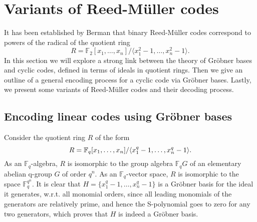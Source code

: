 \documentclass[english,bachelor]{liumaiex}
\begin{document}
\section{Variants of Reed-M{\"u}ller codes}
It has been established by Berman \cite{berman} that binary Reed-M{\"u}ller codes correspond to powers of the radical of the quotient ring
\begin{displaymath}
R=\mathbb{F}_2[x_1,\dots,x_n]/\langle x_1^2-1,\dots,x_n^2-1\rangle.
\end{displaymath}
In this section we will explore a strong link between the theory of Gröbner bases and cyclic codes, defined in terms of ideals in quotient rings. Then we give an outline of a general encoding process for a cyclic code via Gröbner bases. Lastly, we present some variants of Reed-M{\"u}ller codes and their decoding process.

\subsection{Encoding linear codes using Gröbner bases}
Consider the quotient ring $R$ of the form
\begin{displaymath}
R=\mathbb{F}_q[x_1,\dots,x_n]/\langle x_1^q-1,\dots,x_n^q-1\rangle.
\end{displaymath}
As an $\mathbb{F}_q$-algebra, $R$ is isomorphic to the group algebra $\mathbb{F}_qG$ of an elementary abelian q-group $G$ of order $q^n$. As an $\mathbb{F}_q$-vector space, $R$ is isomorphic to the space $\mathbb{F}_q^{q^n}$. It is clear that $H=\{x_1^q-1,\dots,x_n^q-1\}$ is a Gröbner basis for the ideal it generates, w.r.t. all monomial orders, since all leading monomials of the generators are relatively prime, and hence the S-polynomial goes to zero for any two generators, which proves that $H$ is indeed a Gröbner basis.
\end{document}
